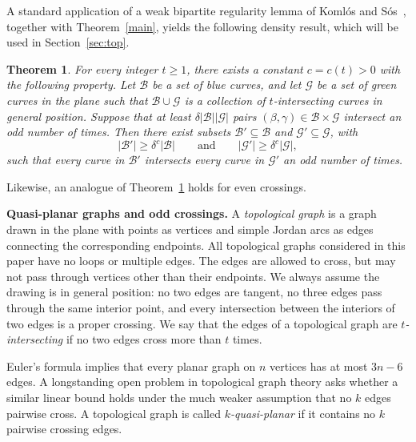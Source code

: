 \documentclass[11pt]{article}
\theoremstyle{plain}
\newtheorem{theorem}{Theorem}[section]
\theoremstyle{definition}
\theoremstyle{remark}
\begin{document}
 
 
\noindent A standard application of a weak bipartite regularity lemma of
Koml\'os and S\'os~\cite[Theorem~9.4.1]{Matousek}, together with
Theorem~\ref{main}, yields the following density result, which will be used in Section~\ref{sec:top}.
 

 


\begin{theorem}\label{thm:dense}
For every integer \(t \ge 1\), there exists a constant \(c=c(t)>0\) with the
following property. Let \(\mathcal B\) be a set of blue curves, and let
\(\mathcal G\) be a set of green curves in the plane such that
\(\mathcal B\cup \mathcal G\) is a collection of \(t\)-intersecting curves in
general position. Suppose that at least $\delta |\mathcal B||\mathcal G|$ pairs \((\beta,\gamma)\in \mathcal B\times \mathcal G\) intersect an odd
number of times. Then there exist subsets
\(\mathcal B'\subseteq \mathcal B\) and
\(\mathcal G'\subseteq \mathcal G\), with
\[
|\mathcal B'|\ge \delta^c |\mathcal B|
\qquad\text{and}\qquad
|\mathcal G'|\ge \delta^c |\mathcal G|,
\]
such that every curve in \(\mathcal B'\) intersects every curve in
\(\mathcal G'\) an odd number of times.
\end{theorem}



\noindent Likewise, an analogue of Theorem~\ref{thm:dense} holds for even crossings.


\medskip

\noindent \textbf{Quasi-planar graphs and odd crossings.}  A \emph{topological graph} is a graph drawn in the plane with points as vertices and simple Jordan arcs as edges connecting the corresponding endpoints. All topological graphs considered in this paper have no loops or multiple edges.  The edges are allowed to cross, but may not pass through vertices other than their endpoints. We always assume the drawing is in general position: no two edges are tangent,
no three edges pass through the same interior point, and every intersection
between the interiors of two edges is a proper crossing.  We say that the edges of a topological graph are \emph{\(t\)-intersecting} if no two edges cross more than \(t\) times.

Euler's formula implies that every planar graph on \(n\) vertices has at most
\(3n-6\) edges. A longstanding open problem in topological graph theory asks
whether a similar linear bound holds under the much weaker assumption that no
\(k\) edges pairwise cross. A topological graph is called
\emph{\(k\)-quasi-planar} if it contains no \(k\) pairwise crossing edges.
\end{document}
